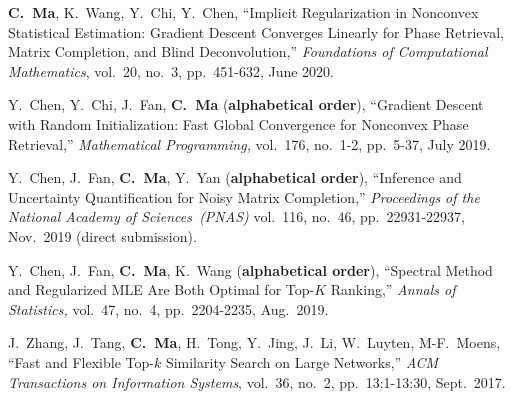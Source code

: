 \documentclass[a4paper, 10pt]{article}
\newenvironment{changemargin}[2]{%
  \begin{list}{}{%
    \setlength{\topsep}{0pt}%
    \setlength{\leftmargin}{#1}%
    \setlength{\rightmargin}{#2}%
    \setlength{\listparindent}{\parindent}%
    \setlength{\itemindent}{\parindent}%
    \setlength{\parsep}{\parskip}%
  }%
  \item[]}{\end{list}
}
\newenvironment{body} {
	\vspace*{-16pt}
	\begin{changemargin}{-0.3in}{-0.5in}
  }	
	{\end{changemargin}
}
\begin{document}
\begin{body}
\begin{enumerate}[label={[{J}{{\arabic*}}]}]
\item \textbf{C.~Ma}, K.~Wang, Y.~Chi, Y.~Chen, {{``Implicit Regularization in Nonconvex Statistical Estimation: Gradient Descent Converges Linearly for Phase Retrieval, Matrix Completion, and Blind Deconvolution,''}}  \emph{Foundations of Computational Mathematics}, vol.~20, no.~3, pp.~451-632, June
2020. \\


\item Y.~Chen, Y.~Chi, J.~Fan, \textbf{C.~Ma} (\textbf{alphabetical order}), {``Gradient Descent with Random Initialization: Fast Global Convergence for Nonconvex Phase Retrieval,''} \emph{Mathematical Programming,} vol.~176, no.~1-2, pp.~5-37, July 2019. \\


\item Y.~Chen, J.~Fan, \textbf{C.~Ma}, Y.~Yan (\textbf{alphabetical order}), {``Inference and Uncertainty Quantification for Noisy Matrix Completion,''} \emph{Proceedings of the National Academy of Sciences~(PNAS)} vol.~116, no.~46, pp.~22931-22937, Nov.~2019 (direct submission). \\




	
\item 
	Y.~Chen, J.~Fan, \textbf{C.~Ma}, K.~Wang (\textbf{alphabetical order}), {{``Spectral Method and Regularized MLE Are Both Optimal for Top-$K$ Ranking,''}} \emph{Annals of Statistics,} vol.~47, no.~4, pp.~2204-2235, Aug.~2019. \\







	
	\item J.~Zhang, J.~Tang, \textbf{C.~Ma}, H.~Tong, Y.~Jing, J.~Li, W.~Luyten, M-F.~Moens, {{``Fast and Flexible Top-$k$ Similarity Search on Large Networks,''}} \emph{ACM Transactions on Information Systems}, vol.~36, no.~2,  pp.~13:1-13:30, Sept.~2017.\\
	
\end{enumerate}
\end{body}
\end{document}
